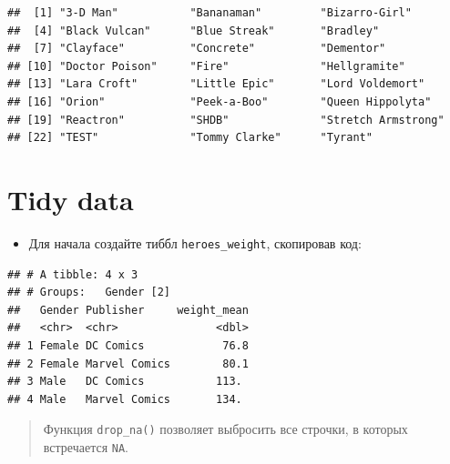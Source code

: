 \documentclass[]{book}
\newenvironment{Shaded}{\begin{snugshade}}{\end{snugshade}}
\newcommand{\KeywordTok}[1]{\textcolor[rgb]{0.13,0.29,0.53}{\textbf{#1}}}
\newcommand{\DataTypeTok}[1]{\textcolor[rgb]{0.13,0.29,0.53}{#1}}
\newcommand{\StringTok}[1]{\textcolor[rgb]{0.31,0.60,0.02}{#1}}
\newcommand{\OtherTok}[1]{\textcolor[rgb]{0.56,0.35,0.01}{#1}}
\newcommand{\OperatorTok}[1]{\textcolor[rgb]{0.81,0.36,0.00}{\textbf{#1}}}
\newcommand{\NormalTok}[1]{#1}
\providecommand{\tightlist}{%
  \setlength{\itemsep}{0pt}\setlength{\parskip}{0pt}}
\begin{document}
\begin{verbatim}
##  [1] "3-D Man"           "Bananaman"         "Bizarro-Girl"     
##  [4] "Black Vulcan"      "Blue Streak"       "Bradley"          
##  [7] "Clayface"          "Concrete"          "Dementor"         
## [10] "Doctor Poison"     "Fire"              "Hellgramite"      
## [13] "Lara Croft"        "Little Epic"       "Lord Voldemort"   
## [16] "Orion"             "Peek-a-Boo"        "Queen Hippolyta"  
## [19] "Reactron"          "SHDB"              "Stretch Armstrong"
## [22] "TEST"              "Tommy Clarke"      "Tyrant"
\end{verbatim}

\section{Tidy data}\label{solution_join}

\begin{itemize}
\tightlist
\item
  Для начала создайте тиббл \texttt{heroes\_weight}, скопировав код:
\end{itemize}

\begin{Shaded}
\end{Shaded}

\begin{verbatim}
## # A tibble: 4 x 3
## # Groups:   Gender [2]
##   Gender Publisher     weight_mean
##   <chr>  <chr>               <dbl>
## 1 Female DC Comics            76.8
## 2 Female Marvel Comics        80.1
## 3 Male   DC Comics           113. 
## 4 Male   Marvel Comics       134.
\end{verbatim}

\begin{quote}
Функция \texttt{drop\_na()} позволяет выбросить все строчки, в которых
встречается \texttt{NA}.
\end{quote}
\end{document}

